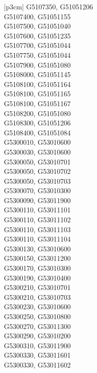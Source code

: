 \begin{customLongTable}{ |p{3cm}| }
G5107350, G51051206 \\ \hline
G5107400, G51051155 \\ \hline
G5107500, G51051040 \\ \hline
G5107600, G51051235 \\ \hline
G5107700, G51051044 \\ \hline
G5107750, G51051044 \\ \hline
G5107900, G51051080 \\ \hline
G5108000, G51051145 \\ \hline
G5108100, G51051164 \\ \hline
G5108100, G51051165 \\ \hline
G5108100, G51051167 \\ \hline
G5108200, G51051080 \\ \hline
G5108300, G51051206 \\ \hline
G5108400, G51051084 \\ \hline
G5300010, G53010600 \\ \hline
G5300030, G53010600 \\ \hline
G5300050, G53010701 \\ \hline
G5300050, G53010702 \\ \hline
G5300050, G53010703 \\ \hline
G5300070, G53010300 \\ \hline
G5300090, G53011900 \\ \hline
G5300110, G53011101 \\ \hline
G5300110, G53011102 \\ \hline
G5300110, G53011103 \\ \hline
G5300110, G53011104 \\ \hline
G5300130, G53010600 \\ \hline
G5300150, G53011200 \\ \hline
G5300170, G53010300 \\ \hline
G5300190, G53010400 \\ \hline
G5300210, G53010701 \\ \hline
G5300210, G53010703 \\ \hline
G5300230, G53010600 \\ \hline
G5300250, G53010800 \\ \hline
G5300270, G53011300 \\ \hline
G5300290, G53010200 \\ \hline
G5300310, G53011900 \\ \hline
G5300330, G53011601 \\ \hline
G5300330, G53011602 \\ \hline

\end{customLongTable}
